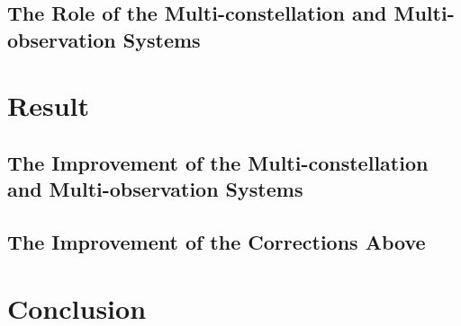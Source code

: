 \documentclass{article}
\begin{document}
\subsection{The Role of the Multi-constellation and Multi-observation Systems}
\section{Result}

\subsection{The Improvement of the Multi-constellation and Multi-observation Systems}

\subsection{The Improvement of the Corrections Above}

\section{Conclusion}



 
 
\end{document}
